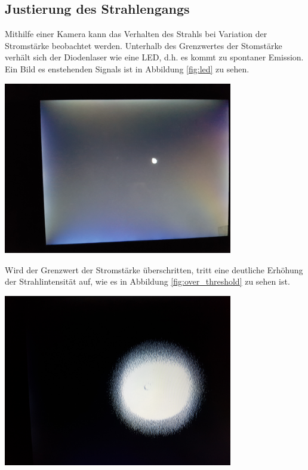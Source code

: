 \documentclass[captions=tableheading]{scrartcl}
\begin{document}
\subsection{Justierung des Strahlengangs}
Mithilfe einer Kamera kann das Verhalten des Strahls bei Variation der Stromstärke beobachtet werden. Unterhalb des Grenzwertes der Stomstärke verhält sich der Diodenlaser wie eine LED, d.h. es kommt zu spontaner Emission. Ein Bild es enstehenden Signals ist in Abbildung \ref{fig:led} zu sehen.
\begin{center}
	\includegraphics[width=10cm]{images/led_spot.jpg}
	\label{fig:led}
\end{center}
Wird der Grenzwert der Stromstärke überschritten, tritt eine deutliche Erhöhung der Strahlintensität auf, wie es in Abbildung \ref{fig:over_threshold} zu sehen ist. 
\begin{center}
	\includegraphics[width=10cm]{images/over_threshold.jpg}
	\label{fig:over_threshold}
\end{center}
\end{document}
